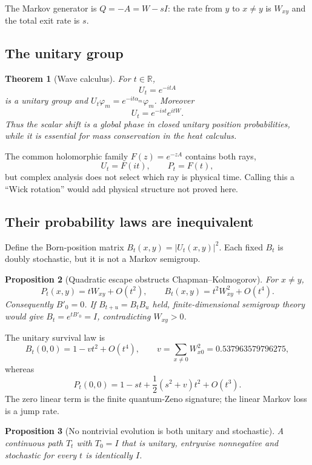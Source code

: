 \documentclass[11pt,a4paper]{article}
\newtheorem{theorem}{Theorem}[section]
\newtheorem{proposition}[theorem]{Proposition}
\theoremstyle{definition}
\theoremstyle{remark}
\newcommand{\R}{\mathbb R}
\begin{document}
The Markov generator is $Q=-A=W-sI$: the rate from $y$ to $x\ne y$ is $W_{xy}$ and the total exit rate is $s$.

\subsection{The unitary group}

\begin{theorem}[Wave calculus]
For $t\in\R$,
\[
 U_t=e^{-itA}
\]
is a unitary group and $U_t\varphi_m=e^{-it\alpha_m}\varphi_m$. Moreover
\[
 U_t=e^{-ist}e^{itW}.
\]
Thus the scalar shift is a global phase in closed unitary position probabilities, while it is essential for mass conservation in the heat calculus.
\end{theorem}

The common holomorphic family $F(z)=e^{-zA}$ contains both rays,
\[
 U_t=F(it),\qquad P_t=F(t),
\]
but complex analysis does not select which ray is physical time. Calling this a ``Wick rotation'' would add physical structure not proved here.

\subsection{Their probability laws are inequivalent}

Define the Born-position matrix $B_t(x,y)=|U_t(x,y)|^2$. Each fixed $B_t$ is doubly stochastic, but it is not a Markov semigroup.

\begin{proposition}[Quadratic escape obstructs Chapman--Kolmogorov]\label{prop:born-not-markov}
For $x\ne y$,
\[
 P_t(x,y)=tW_{xy}+O(t^2),\qquad
 B_t(x,y)=t^2W_{xy}^2+O(t^4).
\]
Consequently $B'_0=0$. If $B_{t+u}=B_tB_u$ held, finite-dimensional semigroup theory would give $B_t=e^{tB'_0}=I$, contradicting $W_{xy}>0$.
\end{proposition}

The unitary survival law is
\[
 B_t(0,0)=1-vt^2+O(t^4),\qquad
 v=\sum_{x\ne0}W_{x0}^2=0.537963579796275,
\]
whereas
\[
 P_t(0,0)=1-st+\frac12(s^2+v)t^2+O(t^3).
\]
The zero linear term is the finite quantum-Zeno signature; the linear Markov loss is a jump rate.

\begin{proposition}[No nontrivial evolution is both unitary and stochastic]
A continuous path $T_t$ with $T_0=I$ that is unitary, entrywise nonnegative and stochastic for every $t$ is identically $I$.
\end{proposition}
\end{document}
